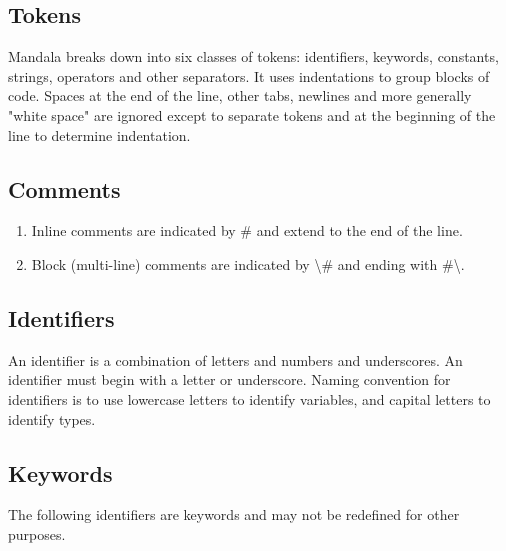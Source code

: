 \documentclass[12pt]{report}
\begin{document}
	\subsection*{Tokens}
    
    Mandala breaks down into six classes of tokens: identifiers, keywords, constants, strings, operators and other separators. It uses indentations to group blocks of code. Spaces at the end of the line, other tabs, newlines and more generally "white space" are ignored except to separate tokens and at the beginning of the line to determine indentation.  
    
    \subsection*{Comments}
    
    \begin{enumerate}
      \item Inline comments are indicated by \# and extend to the end of the line. 
      \item Block (multi-line) comments are indicated by \textbackslash \# and ending with \#\textbackslash.
	\end{enumerate}
    
    \subsection*{Identifiers}
    
    An identifier is  a combination of letters and numbers and underscores. An identifier must begin with a letter or underscore. Naming convention for identifiers is to use lowercase letters to identify variables, and capital letters to identify types.

    
    \subsection*{Keywords}
    
    The following identifiers are keywords and may not be redefined for other purposes.
    
\end{document}
